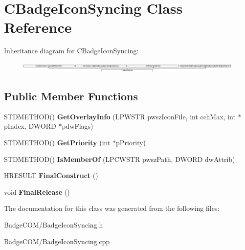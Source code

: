 \hypertarget{class_c_badge_icon_syncing}{\section{C\-Badge\-Icon\-Syncing Class Reference}
\label{class_c_badge_icon_syncing}
}
Inheritance diagram for C\-Badge\-Icon\-Syncing\-:\begin{figure}[H]
\begin{center}
\leavevmode
\includegraphics[height=0.532319cm]{class_c_badge_icon_syncing}
\end{center}
\end{figure}
\subsection*{Public Member Functions}
\begin{DoxyCompactItemize}
\item 
\hypertarget{class_c_badge_icon_syncing_aadb097fd9dda41fc26e1b51aea6fd497}{S\-T\-D\-M\-E\-T\-H\-O\-D() {\bfseries Get\-Overlay\-Info} (L\-P\-W\-S\-T\-R pwsz\-Icon\-File, int cch\-Max, int $\ast$p\-Index, D\-W\-O\-R\-D $\ast$pdw\-Flags)}\label{class_c_badge_icon_syncing_aadb097fd9dda41fc26e1b51aea6fd497}

\item 
\hypertarget{class_c_badge_icon_syncing_a8e3f10e66f07c0cb5c538a3feae6ca82}{S\-T\-D\-M\-E\-T\-H\-O\-D() {\bfseries Get\-Priority} (int $\ast$p\-Priority)}\label{class_c_badge_icon_syncing_a8e3f10e66f07c0cb5c538a3feae6ca82}

\item 
\hypertarget{class_c_badge_icon_syncing_a6c3d2518633f68aa4e977020a91a5892}{S\-T\-D\-M\-E\-T\-H\-O\-D() {\bfseries Is\-Member\-Of} (L\-P\-C\-W\-S\-T\-R pwsz\-Path, D\-W\-O\-R\-D dw\-Attrib)}\label{class_c_badge_icon_syncing_a6c3d2518633f68aa4e977020a91a5892}

\item 
\hypertarget{class_c_badge_icon_syncing_a187d4b7a9734663a51d46ae63ef3f827}{H\-R\-E\-S\-U\-L\-T {\bfseries Final\-Construct} ()}\label{class_c_badge_icon_syncing_a187d4b7a9734663a51d46ae63ef3f827}

\item 
\hypertarget{class_c_badge_icon_syncing_a2b02847ff1ef2a236ea4d75da277553e}{void {\bfseries Final\-Release} ()}\label{class_c_badge_icon_syncing_a2b02847ff1ef2a236ea4d75da277553e}

\end{DoxyCompactItemize}


The documentation for this class was generated from the following files\-:\begin{DoxyCompactItemize}
\item 
Badge\-C\-O\-M/Badge\-Icon\-Syncing.\-h\item 
Badge\-C\-O\-M/Badge\-Icon\-Syncing.\-cpp\end{DoxyCompactItemize}

